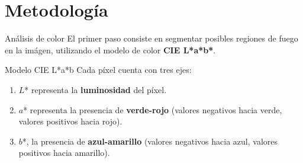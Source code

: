 \documentclass{beamer}
\begin{document}
\section{Metodología}
\begin{frame}{Análisis de color}
El primer paso consiste en segmentar posibles regiones de fuego en la imágen, utilizando el modelo de color \textbf{CIE L*a*b*}.
\end{frame}
\begin{frame}{Modelo CIE L*a*b}
    Cada píxel cuenta con tres ejes:
\begin{enumerate}
    \item $L$* representa la \textbf{luminosidad} del píxel.
    \item $a$* representa la presencia de \textbf{verde-rojo} (valores negativos hacia verde, valores positivos hacia rojo).
    \item $b$*, la presencia de \textbf{azul-amarillo} (valores negativos hacia azul, valores positivos hacia amarillo).
\end{enumerate}
\begin{figure}
    \centering    
\end{figure}

\end{frame}
\end{document}
